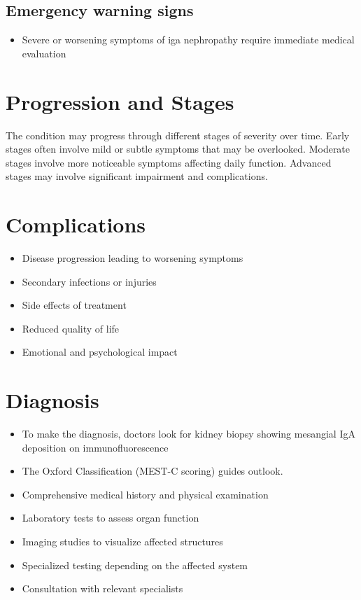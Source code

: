 \subsection{Emergency warning signs}
\begin{itemize}[noitemsep]
  \item Severe or worsening symptoms of iga nephropathy require immediate medical evaluation
\end{itemize}
\section{Progression and Stages}
The condition may progress through different stages of severity over time. Early stages often involve mild or subtle symptoms that may be overlooked. Moderate stages involve more noticeable symptoms affecting daily function. Advanced stages may involve significant impairment and complications.
\section{Complications}
\begin{itemize}[noitemsep]
  \item Disease progression leading to worsening symptoms
  \item Secondary infections or injuries
  \item Side effects of treatment
  \item Reduced quality of life
  \item Emotional and psychological impact
\end{itemize}
\section{Diagnosis}
\begin{itemize}[noitemsep]
  \item To make the diagnosis, doctors look for kidney biopsy showing mesangial IgA deposition on immunofluorescence
  \item The Oxford Classification (MEST-C scoring) guides outlook.
  \item Comprehensive medical history and physical examination
  \item Laboratory tests to assess organ function
  \item Imaging studies to visualize affected structures
  \item Specialized testing depending on the affected system
  \item Consultation with relevant specialists
\end{itemize}
